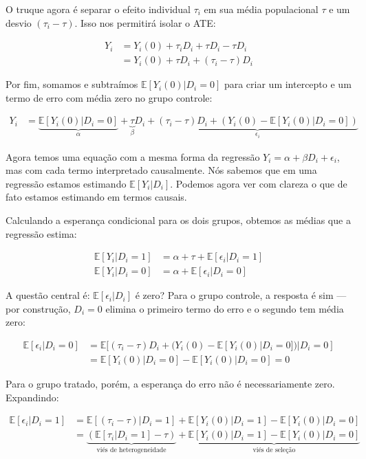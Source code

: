 \documentclass[
]{article}
\begin{document}
O truque agora é separar o efeito individual \(\tau_i\) em sua média populacional \(\tau\) e um desvio \((\tau_i - \tau)\). Isso nos permitirá isolar o ATE:

\[
\begin{aligned}
Y_i &= Y_i(0) + \tau_i D_i + \tau D_i - \tau D_i\\
&= Y_i(0) + \tau D_i + (\tau_i - \tau)D_i
\end{aligned}
\]

Por fim, somamos e subtraímos \(\mathbb{E}[Y_i(0)|D_i=0]\) para criar um intercepto e um termo de erro com média zero no grupo controle:

\[
\begin{aligned}
Y_i &= \underbrace{\mathbb{E}[Y_i(0)|D_i=0]}_{\alpha} + \underbrace{\tau}_{\beta} D_i + \underbrace{(\tau_i - \tau)D_i + (Y_i(0) - \mathbb{E}[Y_i(0)|D_i=0])}_{\epsilon_i}
\end{aligned}
\]

Agora temos uma equação com a mesma forma da regressão \(Y_i = \alpha + \beta D_i + \epsilon_i\), mas com cada termo interpretado causalmente. Nós sabemos que em uma regressão estamos estimando \(\mathbb{E}[Y_i|D_i]\). Podemos agora ver com clareza o que de fato estamos estimando em termos causais.

Calculando a esperança condicional para os dois grupos, obtemos as médias que a regressão estima:

\[
\begin{aligned}
\mathbb{E}[Y_i|D_i=1] &= \alpha + \tau + \mathbb{E}[\epsilon_i|D_i=1] \\
\mathbb{E}[Y_i|D_i=0] &= \alpha + \mathbb{E}[\epsilon_i|D_i=0]
\end{aligned}
\]

A questão central é: \(\mathbb{E}[\epsilon_i|D_i]\) é zero? Para o grupo controle, a resposta é sim --- por construção, \(D_i = 0\) elimina o primeiro termo do erro e o segundo tem média zero:

\[
\begin{aligned}
\mathbb{E}[\epsilon_i|D_i=0]  &=  \mathbb{E}[(\tau_i - \tau)D_i + (Y_i(0) - \mathbb{E}[Y_i(0)|D_i=0])|D_i=0] \\
&= \mathbb{E}[Y_i(0)|D_i=0] - \mathbb{E}[Y_i(0)|D_i=0] = 0
\end{aligned}
\]

Para o grupo tratado, porém, a esperança do erro não é necessariamente zero. Expandindo:

\[
\begin{aligned}
\mathbb{E}[\epsilon_i|D_i=1]  &=  \mathbb{E}[(\tau_i - \tau)|D_i=1] + \mathbb{E}[Y_i(0)|D_i=1] - \mathbb{E}[Y_i(0)|D_i=0] \\
&=  \underbrace{(\mathbb{E}[\tau_i|D_i=1] -\tau)}_{\text{viés de heterogeneidade}} + \underbrace{\mathbb{E}[Y_i(0)|D_i=1] - \mathbb{E}[Y_i(0)|D_i=0]}_{\text{viés de seleção}}
\end{aligned}
\]
\end{document}
